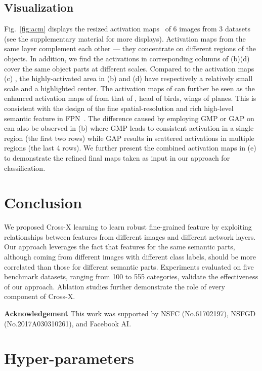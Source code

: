 \documentclass[10pt,twocolumn,letterpaper]{article}
\begin{document}
\subsection{Visualization}
\label{sec:vis}
Fig.~\ref{fig:acm} displays the resized activation maps~\cite{cam@torralba} of 6 images from 3 datasets (see the supplementary material for more displays). Activation maps from the same layer complement each other --- they concentrate on different regions of the objects. In addition, we find the activations in corresponding columns of (b)(d) cover the same object parts at different scales. Compared to the activation maps (c) , the highly-activated area in (b)  and (d)  have respectively a relatively small scale and a highlighted center. The activation maps of  can further be seen as the enhanced activation maps of  from that of , \eg head of birds, wings of planes.
This is consistent with the design of the fine spatial-resolution and rich high-level semantic feature in FPN~\cite{fpn17kaiming}. The difference caused by employing GMP or GAP on  can also be observed in (b) where GMP leads to consistent activation in a single region (the first two rows) while GAP results in scattered activations in multiple regions (the last 4 rows). 
We further present the combined activation maps in (e) to demonstrate the refined final maps taken as input in our approach for classification. 


\section{Conclusion}
\label{sec:clus}
We proposed Cross-X learning to learn robust fine-grained feature by exploiting relationships between features from different images and different network layers. Our approach leverages the fact that
features for the same semantic parts, although coming from different images with different class labels, should be more correlated than those for different semantic parts. Experiments evaluated on five benchmark datasets, ranging from 100 to 555 categories, validate the effectiveness of our approach. Ablation studies further demonstrate the role of every component of Cross-X.

\noindent\textbf{Acknowledgement}
This work was supported by NSFC (No.61702197), NSFGD (No.2017A030310261), and Facebook AI.

{\small


}




\appendix
\section{Hyper-parameters}
\label{sec:hyperparams}
\end{document}
